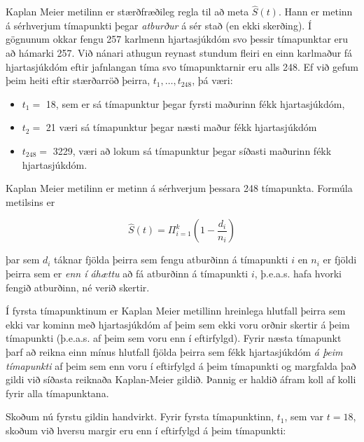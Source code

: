 \documentclass[
]{book}
\newenvironment{Shaded}{\begin{snugshade}}{\end{snugshade}}
\newcommand{\DecValTok}[1]{\textcolor[rgb]{0.00,0.00,0.81}{#1}}
\newcommand{\KeywordTok}[1]{\textcolor[rgb]{0.13,0.29,0.53}{\textbf{#1}}}
\newcommand{\NormalTok}[1]{#1}
\newcommand{\OperatorTok}[1]{\textcolor[rgb]{0.81,0.36,0.00}{\textbf{#1}}}
\providecommand{\tightlist}{%
  \setlength{\itemsep}{0pt}\setlength{\parskip}{0pt}}
\begin{document}
Kaplan Meier metilinn er stærðfræðileg regla til að meta \(\hat S(t)\). Hann er metinn á sérhverjum tímapunkti þegar \emph{atburður} á sér stað (en ekki skerðing). Í gögnunum okkar fengu 257 karlmenn hjartasjúkdóm svo þessir tímapunktar eru að hámarki 257. Við nánari athugun reynast stundum fleiri en einn karlmaður fá hjartasjúkdóm eftir jafnlangan tíma svo tímapunktarnir eru alls 248. Ef við gefum þeim heiti eftir stærðarröð þeirra, \(t_1, \ldots , t_{248}\), þá væri:

\begin{itemize}
\tightlist
\item
  \(t_1 =\) 18, sem er sá tímapunktur þegar fyrsti maðurinn fékk hjartasjúkdóm,
\item
  \(t_2 =\) 21 væri sá tímapunktur þegar næsti maður fékk hjartasjúkdóm
\item
  \(t_{248} =\) 3229, væri að lokum sá tímapunktur þegar síðasti maðurinn fékk hjartasjúkdóm.
\end{itemize}

Kaplan Meier metilinn er metinn á sérhverjum þessara 248 tímapunkta. Formúla metilsins er

\[ \hat S(t) = \Pi_{i=1}^k \left( 1- \frac{d_i}{n_i} \right)\]

þar sem \(d_i\) táknar fjölda þeirra sem fengu atburðinn á tímapunkti \(i\) en \(n_i\) er fjöldi þeirra sem er \emph{enn í áhættu} að fá atburðinn á tímapunkti \(i\), þ.e.a.s. hafa hvorki fengið atburðinn, né verið skertir.

Í fyrsta tímapunktinum er Kaplan Meier metillinn hreinlega hlutfall þeirra sem ekki var kominn með hjartasjúkdóm af þeim sem ekki voru orðnir skertir á þeim tímapunkti (þ.e.a.s. af þeim sem voru enn í eftirfylgd). Fyrir næsta tímapunkt þarf að reikna einn mínus hlutfall fjölda þeirra sem fékk hjartasjúkdóm \emph{á þeim tímapunkti} af þeim sem enn voru í eftirfylgd á þeim tímapunkti og margfalda það gildi við síðasta reiknaða Kaplan-Meier gildið. Þannig er haldið áfram koll af kolli fyrir alla tímapunktana.

Skoðum nú fyrstu gildin handvirkt. Fyrir fyrsta tímapunktinn, \(t_1\), sem var \(t=18\), skoðum við hversu margir eru enn í eftirfylgd á þeim tímapunkti:

\begin{Shaded}
\end{Shaded}
\end{document}
